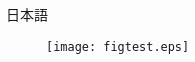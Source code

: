 \documentclass[a4j]{jsbook}
\begin{document}
日本語
\begin{figure}
\texttt{[image: figtest.eps]}
\end{figure}
\end{document}
